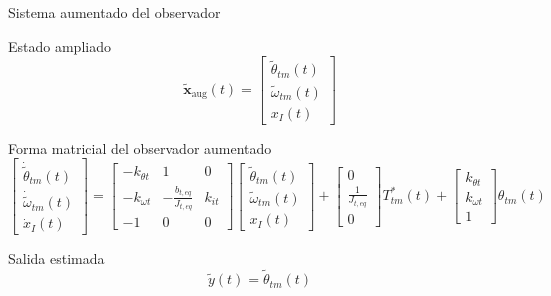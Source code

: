\begin{frame}{Sistema aumentado del observador}
  \begin{block}{Estado ampliado}
    \[
    \tilde{\mathbf{x}}_{\text{aug}}(t) = \begin{bmatrix} \tilde{\theta}_{tm}(t) \\ \tilde{\omega}_{tm}(t) \\ x_I(t) \end{bmatrix}
    \]
  \end{block}

  \vspace{-0.15cm}
  \begin{block}{Forma matricial del observador aumentado}
    \[
    \begin{bmatrix}
      \dot{\tilde{\theta}}_{tm}(t) \\
      \dot{\tilde{\omega}}_{tm}(t) \\
      \dot{x}_I(t)
    \end{bmatrix}
    =
    \begin{bmatrix}
      -k_{\theta t} & 1 & 0 \\
      -k_{\omega t} & -\frac{b_{t,eq}}{J_{t,eq}} & k_{it} \\
      -1 & 0 & 0
    \end{bmatrix}
    \begin{bmatrix}
      \tilde{\theta}_{tm}(t) \\
      \tilde{\omega}_{tm}(t) \\
      x_I(t)
    \end{bmatrix}
    +
    \begin{bmatrix}
      0 \\
      \frac{1}{J_{t,eq}} \\
      0
    \end{bmatrix}
    T_{tm}^*(t)
    +
    \begin{bmatrix}
      k_{\theta t} \\
      k_{\omega t} \\
      1
    \end{bmatrix}
    \theta_{tm}(t)
    \]
  \end{block}

  \vspace{-0.1cm}
  \begin{block}{Salida estimada}
    \[
    \tilde{y}(t) = \tilde{\theta}_{tm}(t)
    \]
  \end{block}
\end{frame}

